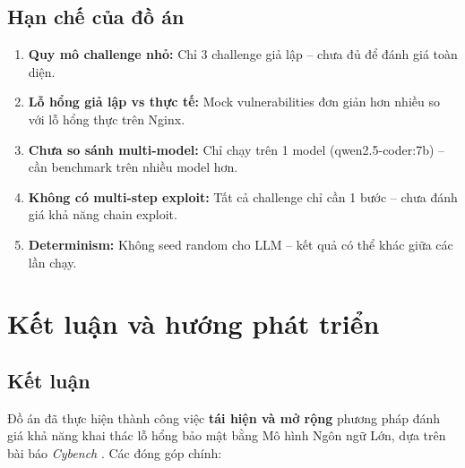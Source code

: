 \documentclass{nt521report}
\begin{document}
\section{Hạn chế của đồ án}
\label{sec:limitations}

\begin{enumerate}
  \item \textbf{Quy mô challenge nhỏ:} Chỉ 3 challenge giả lập -- chưa đủ để đánh giá toàn diện.
  \item \textbf{Lỗ hổng giả lập vs thực tế:} Mock vulnerabilities đơn giản hơn nhiều so với lỗ hổng thực trên Nginx.
  \item \textbf{Chưa so sánh multi-model:} Chỉ chạy trên 1 model (qwen2.5-coder:7b) -- cần benchmark trên nhiều model hơn.
  \item \textbf{Không có multi-step exploit:} Tất cả challenge chỉ cần 1 bước -- chưa đánh giá khả năng chain exploit.
  \item \textbf{Determinism:} Không seed random cho LLM -- kết quả có thể khác giữa các lần chạy.
\end{enumerate}


\chapter{Kết luận và hướng phát triển}
\label{chap:conclusion}

\section{Kết luận}
\label{sec:conclusion}

Đồ án đã thực hiện thành công việc \textbf{tái hiện và mở rộng} phương pháp đánh giá khả năng khai thác lỗ hổng bảo mật bằng Mô hình Ngôn ngữ Lớn, dựa trên bài báo \emph{Cybench} \cite{honestcybereval2024}. Các đóng góp chính:
\end{document}
